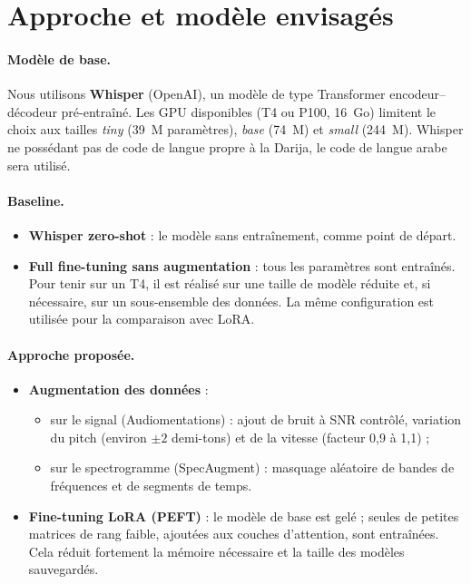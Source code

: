 \documentclass[12pt,a4paper]{report}
\begin{document}
\section{Approche et modèle envisagés}
\paragraph{Modèle de base.}
Nous utilisons \textbf{Whisper} (OpenAI), un modèle de type Transformer
encodeur--décodeur pré-entraîné. Les GPU disponibles (T4 ou P100, 16~Go)
limitent le choix aux tailles \emph{tiny} (39~M paramètres), \emph{base} (74~M)
et \emph{small} (244~M). Whisper ne possédant pas de code de langue propre à la
Darija, le code de langue arabe sera utilisé.

\paragraph{Baseline.}
\begin{itemize}
  \item \textbf{Whisper zero-shot} : le modèle sans entraînement, comme point de
        départ.
  \item \textbf{Full fine-tuning sans augmentation} : tous les paramètres sont
        entraînés. Pour tenir sur un T4, il est réalisé sur une taille de modèle
        réduite et, si nécessaire, sur un sous-ensemble des données. La même
        configuration est utilisée pour la comparaison avec LoRA.
\end{itemize}

\paragraph{Approche proposée.}
\begin{itemize}
  \item \textbf{Augmentation des données} :
        \begin{itemize}
          \item sur le signal (Audiomentations) : ajout de bruit à SNR contrôlé,
                variation du pitch (environ $\pm 2$ demi-tons) et de la vitesse
                (facteur 0,9 à 1,1) ;
          \item sur le spectrogramme (SpecAugment) : masquage aléatoire de bandes
                de fréquences et de segments de temps.
        \end{itemize}
  \item \textbf{Fine-tuning LoRA (PEFT)} : le modèle de base est gelé ; seules de
        petites matrices de rang faible, ajoutées aux couches d'attention, sont
        entraînées. Cela réduit fortement la mémoire nécessaire et la taille des
        modèles sauvegardés.
\end{itemize}
\end{document}
